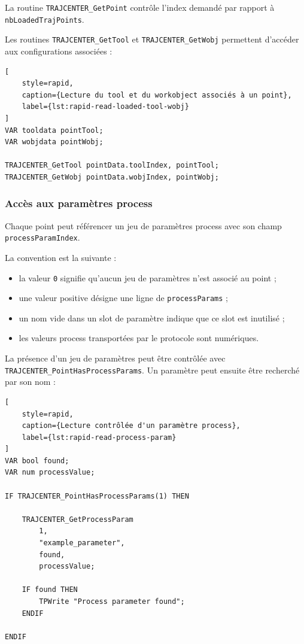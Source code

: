 \documentclass{rapportENSAM}
\begin{document}
La routine \texttt{TRAJCENTER\_GetPoint} contrôle l'index demandé par rapport à \texttt{nbLoadedTrajPoints}.

Les routines \texttt{TRAJCENTER\_GetTool} et
\texttt{TRAJCENTER\_GetWobj} permettent d'accéder aux configurations
associées :

\begin{lstlisting}[
    style=rapid,
    caption={Lecture du tool et du workobject associés à un point},
    label={lst:rapid-read-loaded-tool-wobj}
]
VAR tooldata pointTool;
VAR wobjdata pointWobj;

TRAJCENTER_GetTool pointData.toolIndex, pointTool;
TRAJCENTER_GetWobj pointData.wobjIndex, pointWobj;
\end{lstlisting}


\subsubsection{Accès aux paramètres process}
\label{subsubsec:rapid-process-parameter-access}

Chaque point peut référencer un jeu de paramètres process avec son champ \texttt{processParamIndex}.

La convention est la suivante :

\begin{itemize}
    \item la valeur \texttt{0} signifie qu'aucun jeu de paramètres n'est
    associé au point ;
    \item une valeur positive désigne une ligne de
    \texttt{processParams} ;
    \item un nom vide dans un slot de paramètre indique que ce slot est
    inutilisé ;
    \item les valeurs process transportées par le protocole sont numériques.
\end{itemize}

La présence d'un jeu de paramètres peut être contrôlée avec
\texttt{TRAJCENTER\_PointHasProcessParams}. Un paramètre peut ensuite être
recherché par son nom :

\begin{lstlisting}[
    style=rapid,
    caption={Lecture contrôlée d'un paramètre process},
    label={lst:rapid-read-process-param}
]
VAR bool found;
VAR num processValue;

IF TRAJCENTER_PointHasProcessParams(1) THEN

    TRAJCENTER_GetProcessParam
        1,
        "example_parameter",
        found,
        processValue;

    IF found THEN
        TPWrite "Process parameter found";
    ENDIF

ENDIF
\end{lstlisting}
\end{document}
